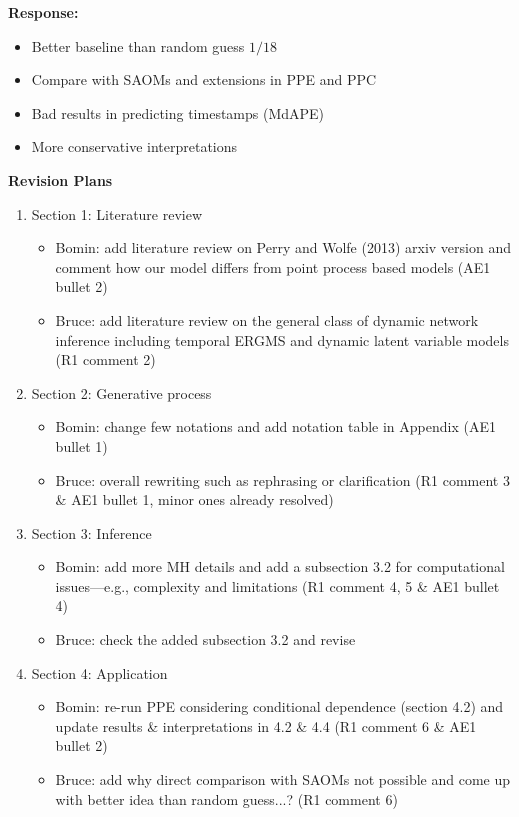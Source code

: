 \documentclass[12pt]{article}
\theoremstyle{definition}
\begin{document}
\begin{itemize}
\textbf{  Response:} 
\begin{itemize}
	\item Better baseline than random guess $1/18$ 
	\item Compare with SAOMs and extensions in PPE and PPC 
	\item Bad results in predicting timestamps (MdAPE)
	\item More conservative interpretations 
\end{itemize}
\end{itemize}

\newpage
\begin{center}
	
	\textbf{Revision Plans}
\end{center}
\begin{enumerate}
	\item Section 1: Literature review
	\begin{itemize}
		\item Bomin: add literature review on Perry and Wolfe (2013) arxiv version and comment how our model differs from point process based models (AE1 bullet 2)
		\item Bruce: add literature review on the general class of dynamic network inference including temporal ERGMS and dynamic latent variable models (R1 comment 2)
	\end{itemize}
	\item Section 2: Generative process
		\begin{itemize}
			\item Bomin: change few notations and add notation table in Appendix (AE1 bullet 1)
			\item Bruce: overall rewriting such as rephrasing or clarification (R1 comment 3 \& AE1 bullet 1, minor ones already resolved)
		\end{itemize}
			\item Section 3: Inference
			\begin{itemize}
		\item Bomin: add more MH details and add a subsection 3.2 for computational issues---e.g., complexity and limitations (R1 comment 4, 5 \& AE1 bullet 4)
				\item Bruce: check the added subsection 3.2 and revise
			\end{itemize}
			\item Section 4: Application
			\begin{itemize}
				\item Bomin: re-run PPE considering conditional dependence (section 4.2) and update results \& interpretations in 4.2 \& 4.4 (R1 comment 6 \& AE1 bullet 2)
				\item Bruce: add why direct comparison with SAOMs not possible and come up with better idea than random guess...? (R1 comment 6)
			\end{itemize}			
	

\end{enumerate}
\end{document}
